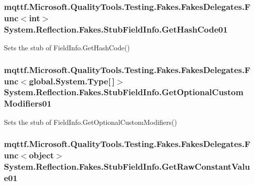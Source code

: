 \hypertarget{class_system_1_1_reflection_1_1_fakes_1_1_stub_field_info_ab1498e7c86ff32afb7ed2b1d5d454860}{
\subsubsection[{Get\-Hash\-Code01}]{\setlength{\rightskip}{0pt plus 5cm}mqttf.\-Microsoft.\-Quality\-Tools.\-Testing.\-Fakes.\-Fakes\-Delegates.\-Func$<$int$>$ System.\-Reflection.\-Fakes.\-Stub\-Field\-Info.\-Get\-Hash\-Code01}}\label{class_system_1_1_reflection_1_1_fakes_1_1_stub_field_info_ab1498e7c86ff32afb7ed2b1d5d454860}


Sets the stub of Field\-Info.\-Get\-Hash\-Code()

\hypertarget{class_system_1_1_reflection_1_1_fakes_1_1_stub_field_info_a29862962dfb8b214cbd9a39a57277619}{
\subsubsection[{Get\-Optional\-Custom\-Modifiers01}]{\setlength{\rightskip}{0pt plus 5cm}mqttf.\-Microsoft.\-Quality\-Tools.\-Testing.\-Fakes.\-Fakes\-Delegates.\-Func$<$global.\-System.\-Type\mbox{[}$\,$\mbox{]}$>$ System.\-Reflection.\-Fakes.\-Stub\-Field\-Info.\-Get\-Optional\-Custom\-Modifiers01}}\label{class_system_1_1_reflection_1_1_fakes_1_1_stub_field_info_a29862962dfb8b214cbd9a39a57277619}


Sets the stub of Field\-Info.\-Get\-Optional\-Custom\-Modifiers()

\hypertarget{class_system_1_1_reflection_1_1_fakes_1_1_stub_field_info_a6f6d572997b8f3bb5a8dd22324f7c4c7}{
\subsubsection[{Get\-Raw\-Constant\-Value01}]{\setlength{\rightskip}{0pt plus 5cm}mqttf.\-Microsoft.\-Quality\-Tools.\-Testing.\-Fakes.\-Fakes\-Delegates.\-Func$<$object$>$ System.\-Reflection.\-Fakes.\-Stub\-Field\-Info.\-Get\-Raw\-Constant\-Value01}}\label{class_system_1_1_reflection_1_1_fakes_1_1_stub_field_info_a6f6d572997b8f3bb5a8dd22324f7c4c7}


